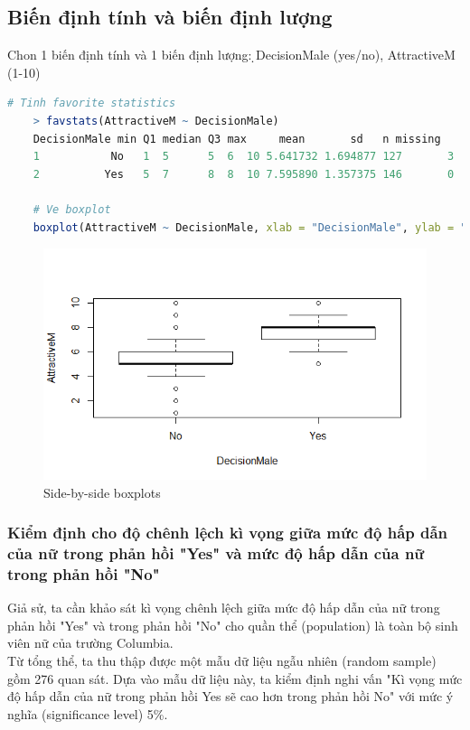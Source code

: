 \documentclass[a4paper,12pt]{article}
\begin{document}
		
	\subsection{Biến định tính và biến định lượng}
	Chon 1 biến định tính và 1 biến định lượng: ̣DecisionMale (yes/no), AttractiveM (1-10)
	
	\begin{lstlisting}[language = R]
	# Tinh favorite statistics
	> favstats(AttractiveM ~ DecisionMale)
	DecisionMale min Q1 median Q3 max     mean       sd   n missing
	1           No   1  5      5  6  10 5.641732 1.694877 127       3
	2          Yes   5  7      8  8  10 7.595890 1.357375 146       0
	
	# Ve boxplot
	boxplot(AttractiveM ~ DecisionMale, xlab = "DecisionMale", ylab = "AttractiveM")
	\end{lstlisting}
	\begin{figure}[H]
		\centering
		\includegraphics[width=0.7\linewidth]{Rplot5}
		\caption{Side-by-side boxplots}
		\label{fig:rplot5}
	\end{figure}
	
	\subsubsection{Kiểm định cho độ chênh lệch kì vọng giữa mức độ hấp dẫn của nữ trong phản hồi "Yes" và mức độ hấp dẫn của nữ trong phản hồi "No"}
	
	Giả sử, ta cần khảo sát kì vọng chênh lệch giữa mức độ hấp dẫn của nữ trong phản hồi "Yes" và trong phản hồi "No" cho quần thể (population) là toàn bộ sinh viên nữ của trường Columbia.\\
	
	Từ tổng thể, ta thu thập được một mẫu dữ liệu ngẫu nhiên (random sample) gồm 276 quan sát. Dựa vào mẫu dữ liệu này, ta kiểm định nghi vấn "Kì vọng mức độ hấp dẫn của nữ trong phản hồi Yes sẽ cao hơn trong phản hồi No" với mức ý nghĩa (significance level) 5\%.\\
	
\end{document}
